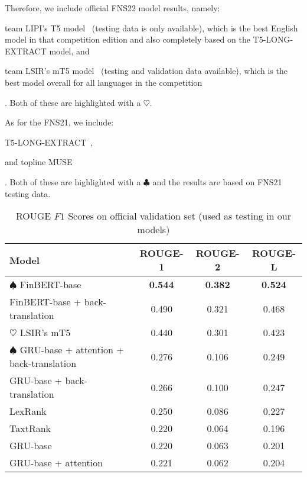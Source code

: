 Therefore, we include official FNS22 model results, namely:
\begin{enumerate*}
    \item team LIPI's T5 model~\cite{el-haj-etal-2022-financial} (testing data is only available), which is the best English model
          in that competition edition and also completely based on the T5-LONG-EXTRACT model, and
    \item team LSIR's mT5 model~\cite{foroutan-etal-2022-multilingual} (testing and validation data available), which is the best model overall for all languages in the competition
\end{enumerate*}.
Both of these are highlighted with a $\heartsuit$.

As for the FNS21, we include:
\begin{enumerate*}
    \item T5-LONG-EXTRACT~\cite{orzhenovskii-2021-t5},
    \item and topline MUSE~\cite{litvak-last-2013-multilingual}
\end{enumerate*}.
Both of these are highlighted with a $\clubsuit$ and the results are based on FNS21 testing data.

\begin{table}[ht]
    \centering
    \begin{tabular}{lccc}
        \toprule
        \textbf{Model} & \textbf{ROUGE-1} & \textbf{ROUGE-2} & \textbf{ROUGE-L} \\
        \midrule
            $\spadesuit$ FinBERT-base & \textbf{0.544} & \textbf{0.382} & \textbf{0.524} \\
            FinBERT-base + back-translation & 0.490 & 0.321 & 0.468 \\
            $\heartsuit$ LSIR's mT5 & 0.440 & 0.301 & 0.423 \\
            $\spadesuit$ GRU-base + attention + back-translation & 0.276 & 0.106 & 0.249 \\
            GRU-base + back-translation & 0.266 & 0.100 & 0.247 \\
            LexRank & 0.250 & 0.086 & 0.227 \\
            TaxtRank & 0.220 & 0.064 & 0.196 \\
            GRU-base & 0.220 & 0.063 & 0.201 \\
            GRU-base + attention & 0.221 & 0.062 & 0.204 \\
        \bottomrule
    \end{tabular}\caption{ROUGE $F1$ Scores on official validation set (used as testing in our models)}
    \label{tab:rouge_performance_validation}
\end{table}

